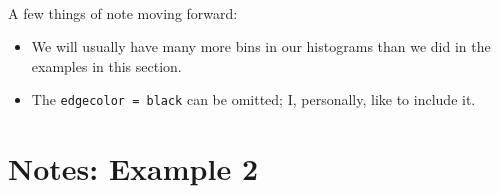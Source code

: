 \documentclass[11pt]{article}
\providecommand{\tightlist}{%
      \setlength{\itemsep}{0pt}\setlength{\parskip}{0pt}}
\begin{document}
    \begin{center}
    \end{center}
    { \hspace*{\fill} \\}
    
    A few things of note moving forward:

\begin{itemize}
\tightlist
\item
  We will usually have many more bins in our histograms than we did in
  the examples in this section.
\item
  The \texttt{edgecolor\ =\ \textquotesingle{}black\textquotesingle{}}
  can be omitted; I, personally, like to include it.
\end{itemize}

    \hypertarget{notes-example-2}{%
\section{Notes: Example 2}\label{notes-example-2}}
\end{document}
